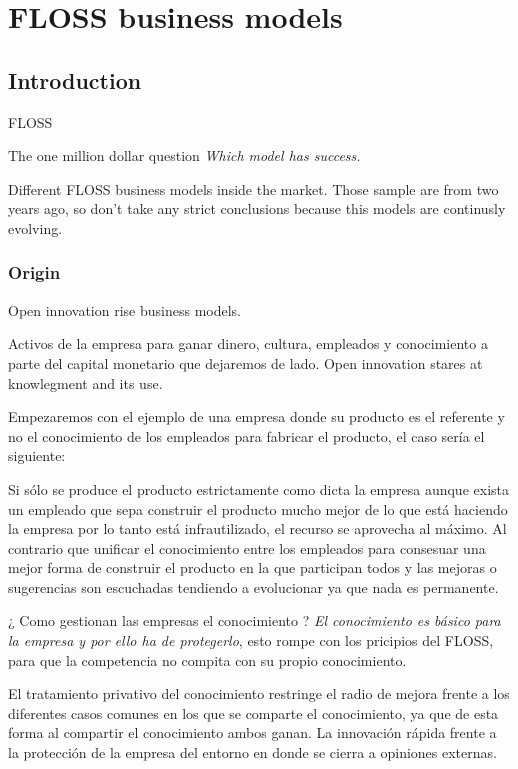\chapter{FLOSS business models}

\section{Introduction}\label{lesson-4-introduction}

FLOSS 

The one million dollar question \emph{Which model has success.}

Different FLOSS business models inside the market. Those sample are from two years ago, so don't take any strict conclusions because this models are continusly evolving.

\subsection{Origin}\label{lesson-4-origin}

Open innovation rise business models.

Activos de la empresa para ganar dinero, cultura, empleados y conocimiento a parte del capital monetario que dejaremos de lado. Open innovation stares at knowlegment and its use.

Empezaremos con el ejemplo de una empresa donde su producto es el referente y no el conocimiento de los empleados para fabricar el producto, el caso sería el siguiente:

Si sólo se produce el producto estrictamente como dicta la empresa aunque exista un empleado que sepa construir el producto mucho mejor de lo que está haciendo la empresa por lo tanto está infrautilizado, el recurso se aprovecha al máximo. Al contrario que unificar el conocimiento entre los empleados para consesuar una mejor forma de construir el producto en la que participan todos y las mejoras o sugerencias son escuchadas tendiendo a evolucionar ya que nada es permanente.

¿ Como gestionan las empresas el conocimiento ? \emph{El conocimiento es básico para la empresa y por ello ha de protegerlo}, esto rompe con los pricipios del FLOSS, para que la competencia no compita con su propio conocimiento.

El tratamiento privativo del conocimiento restringe el radio de mejora frente a los diferentes casos comunes en los que se comparte el conocimiento, ya que de esta forma al compartir el conocimiento ambos ganan. La innovación rápida frente a la protección de la empresa del entorno en donde se cierra a opiniones externas.

